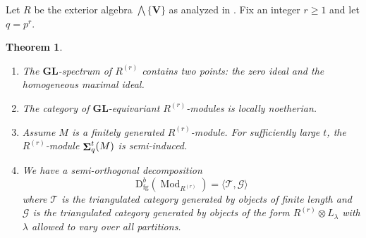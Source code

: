 \documentclass[12pt]{amsart}
\newcommand{\rD}{\mathrm{D}}
\newcommand{\cG}{\mathcal{G}}
\newcommand{\bN}{\mathbf{N}}
\newcommand{\cT}{\mathcal{T}}
\newcommand{\bV}{\mathbf{V}}
\newcommand{\fn}{\mathfrak{n}}
\newcommand{\fp}{\mathfrak{p}}
\newcommand{\lw}{{\textstyle \bigwedge}}
\DeclareMathOperator{\Mod}{Mod}
\DeclareMathOperator{\Sh}{\bf{\Sigma}}
\DeclareMathOperator{\fgen}{fg}
\newcommand{\Sr}{S^{(r)}}
\newcommand{\mShq}{\Sh_{q}}
\newcommand{\GL}{\mathbf{GL}}
\numberwithin{equation}{section}
\newtheorem{theorem}[equation]{Theorem}
\newtheorem{lemma}[equation]{Lemma}
\theoremstyle{definition}
\theoremstyle{plain}
\begin{document}
 
Let $R$ be the exterior algebra $\lw\{\bV\}$ as analyzed in \cite{gan22ext}. Fix an integer $r \geq 1$ and let $q = p^r$. 
   \begin{theorem}
   \leavevmode
   \begin{enumerate}
       \item The $\GL$-spectrum of $R^{(r)}$ contains two points: the zero ideal and the homogeneous maximal ideal.
       \item The category of $\GL$-equivariant $R^{(r)}$-modules is locally noetherian.
       \item Assume $M$ is a finitely generated $R^{(r)}$-module. For sufficiently large $t$, the $R^{(r)}$-module $\mShq^t(M)$ is semi-induced.
       \item We have a semi-orthogonal decomposition 
       $$\rD^b_{\fgen}(\Mod_{R^{(r)}}) = \langle  \cT, \cG \rangle$$
       where $\cT$ is the triangulated category generated by objects of finite length and $\cG$ is the triangulated category generated by objects of the form $R^{(r)} \otimes L_{\lambda}$ with $\lambda$ allowed to vary over all partitions.
   \end{enumerate}
   \end{theorem}
\end{document}

